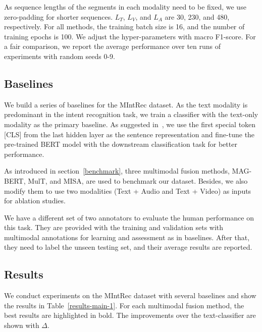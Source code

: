 \documentclass[sigconf,camera-ready]{acmart}
\begin{document}
As sequence lengths of the segments in each modality need to be fixed, we use zero-padding for shorter sequences. $L_{T}$, $L_{V}$, and $L_{A}$  are 30, 230, and 480, respectively. For all methods, the training batch size is 16, and the number of training epochs is 100. We adjust the hyper-parameters with macro F1-score. For a fair comparison, we report the average performance over ten runs of experiments with random seeds 0-9. 

\subsection{Baselines}
We build a series of baselines for the MIntRec dataset. As the text modality is predominant in the intent recognition task, we train a classifier with the text-only modality as the primary baseline. As suggested in~\cite{BERT}, we use the first special token [CLS] from the last hidden layer as the sentence representation and fine-tune the pre-trained BERT model with the downstream classification task for better performance.  

As introduced in section~\ref{benchmark}, three multimodal fusion methods, MAG-BERT, MulT, and MISA, are used to benchmark our dataset. Besides, we also modify them to use two modalities (Text + Audio and Text + Video) as inputs for ablation studies. 

We have a different set of two annotators to evaluate the human performance on this task. They are provided with the training and validation sets with multimodal annotations for learning and assessment as in baselines. After that, they need to label the unseen testing set, and their average results are reported. 

\subsection{Results}
We conduct experiments on the MIntRec dataset with several baselines and show the results in Table~\ref{results-main-1}. For each multimodal fusion method, the best results are highlighted in bold. The improvements over the text-classifier are shown with $\Delta$.
\end{document}
